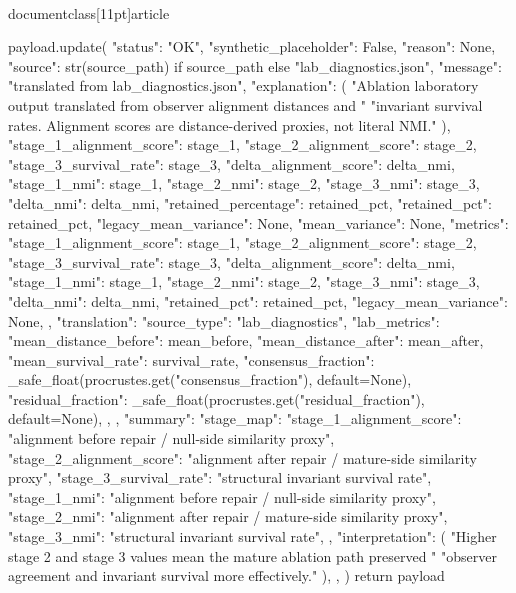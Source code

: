 \\documentclass[11pt]{article}
\begin{document}
\begin{CodeBlock}
    payload.update(
        {
            "status": "OK",
            "synthetic_placeholder": False,
            "reason": None,
            "source": str(source_path) if source_path else "lab_diagnostics.json",
            "message": "translated from lab_diagnostics.json",
            "explanation": (
                "Ablation laboratory output translated from observer alignment distances and "
                "invariant survival rates. Alignment scores are distance-derived proxies, not literal NMI."
            ),
            "stage_1_alignment_score": stage_1,
            "stage_2_alignment_score": stage_2,
            "stage_3_survival_rate": stage_3,
            "delta_alignment_score": delta_nmi,
            "stage_1_nmi": stage_1,
            "stage_2_nmi": stage_2,
            "stage_3_nmi": stage_3,
            "delta_nmi": delta_nmi,
            "retained_percentage": retained_pct,
            "retained_pct": retained_pct,
            "legacy_mean_variance": None,
            "mean_variance": None,
            "metrics": {
                "stage_1_alignment_score": stage_1,
                "stage_2_alignment_score": stage_2,
                "stage_3_survival_rate": stage_3,
                "delta_alignment_score": delta_nmi,
                "stage_1_nmi": stage_1,
                "stage_2_nmi": stage_2,
                "stage_3_nmi": stage_3,
                "delta_nmi": delta_nmi,
                "retained_pct": retained_pct,
                "legacy_mean_variance": None,
            },
            "translation": {
                "source_type": "lab_diagnostics",
                "lab_metrics": {
                    "mean_distance_before": mean_before,
                    "mean_distance_after": mean_after,
                    "mean_survival_rate": survival_rate,
                    "consensus_fraction": _safe_float(procrustes.get("consensus_fraction"), default=None),
                    "residual_fraction": _safe_float(procrustes.get("residual_fraction"), default=None),
                },
            },
            "summary": {
                "stage_map": {
                    "stage_1_alignment_score": "alignment before repair / null-side similarity proxy",
                    "stage_2_alignment_score": "alignment after repair / mature-side similarity proxy",
                    "stage_3_survival_rate": "structural invariant survival rate",
                    "stage_1_nmi": "alignment before repair / null-side similarity proxy",
                    "stage_2_nmi": "alignment after repair / mature-side similarity proxy",
                    "stage_3_nmi": "structural invariant survival rate",
                },
                "interpretation": (
                    "Higher stage 2 and stage 3 values mean the mature ablation path preserved "
                    "observer agreement and invariant survival more effectively."
                ),
            },
        }
    )
    return payload



\end{CodeBlock}
\end{document}
